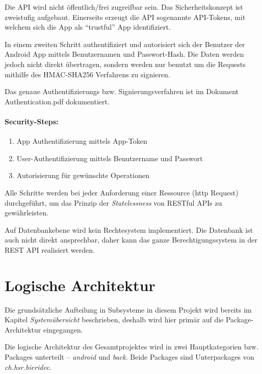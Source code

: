 \documentclass[10pt,a4paper]{scrartcl}
\begin{document}
Die API wird nicht öffentlich/frei zugreifbar sein. Das Sicherheitskonzept ist zweistufig aufgebaut.
Einerseits erzeugt die API sogenannte API-Tokens, mit welchem sich die App als "`trustful"' App
identifiziert.

In einem zweiten Schritt authentifiziert und autorisiert sich der Benutzer der Android App mittels
Benutzernamen und Passwort-Hash. Die Daten werden jedoch nicht direkt übertragen, sondern werden nur
benutzt um die Requests mithilfe des HMAC-SHA256 Verfahrens zu signieren.

Das genaue Authentifizierungs bzw. Signierungsverfahren ist im Dokument Authentication.pdf dokumentiert.

\paragraph*{Security-Steps:}

\begin{enumerate}
	\item App Authentifizierung mittels App-Token
	\item User-Authentifizierung mittels Benutzername und Passwort
	\item Autorisierung für gewünschte Operationen
\end{enumerate}
 
Alle Schritte werden bei jeder Anforderung einer Ressource (http Request) durchgeführt, um das
Prinzip der \textit{Statelessness} von RESTful APIs zu gewährleisten.

Auf Datenbankebene wird kein Rechtesystem implementiert. Die Datenbank ist auch nicht direkt
ansprechbar, daher kann das ganze Berechtigungssystem in der REST API realisiert werden.


\section{Logische Architektur}

Die grundsätzliche Aufteilung in Subsysteme in diesem Projekt wird bereits im Kapitel
\textit{Systemübersicht} beschrieben, deshalb wird hier primär auf die Package-Architektur
eingegangen.

Die logische Architektur des Gesamtprojektes wird in zwei Hauptkategorien bzw. Packages unterteilt --
\textit{android} und \textit{back}. Beide Packages sind Unterpackages von
\textit{ch.hsr.bieridee}.
\end{document}
